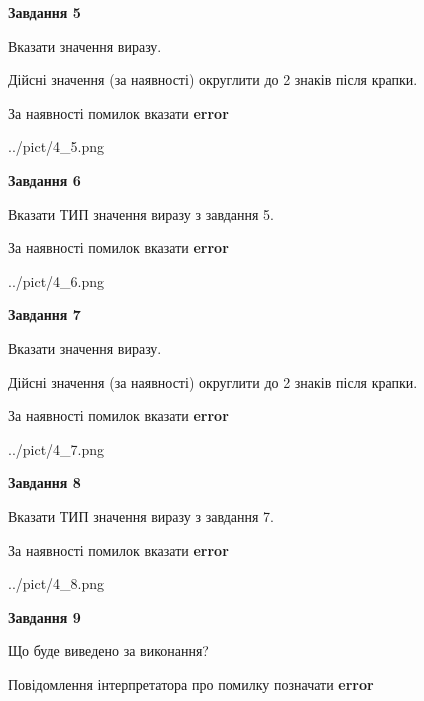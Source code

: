 \documentclass[11pt, ukrainian]{article}
\begin{document}
{\begin {large}
{\begin {center}\textbf{Завдання 5}\end {center}}\par
Вказати значення виразу. \par
Дійсні значення (за наявності) округлити до 2 знаків після крапки. \par
За наявності помилок вказати \textbf{error}

\begin{center}
	{../pict/4_5.png}
\end{center}
\newpage

{\begin {center}\textbf{Завдання 6}\end {center}}\par
Вказати ТИП значення виразу з завдання 5. \par
За наявності помилок вказати \textbf{error}

\begin{center}
	{../pict/4_6.png}
\end{center}
\newpage

{\begin {center}\textbf{Завдання 7}\end {center}}\par
Вказати значення виразу. \par
Дійсні значення (за наявності) округлити до 2 знаків після крапки. \par
За наявності помилок вказати \textbf{error}

\begin{center}
	{../pict/4_7.png}
\end{center}
\newpage

{\begin {center}\textbf{Завдання 8}\end {center}}\par
Вказати ТИП значення виразу з завдання 7. \par
За наявності помилок вказати \textbf{error}

\begin{center}
	{../pict/4_8.png}
\end{center}
\newpage

{\begin {center}\textbf{Завдання 9}\end {center}}\par
Що буде виведено за виконання? \par
Повідомлення інтерпретатора про помилку позначати \textbf{error}


\end{large}}
\end{document}
